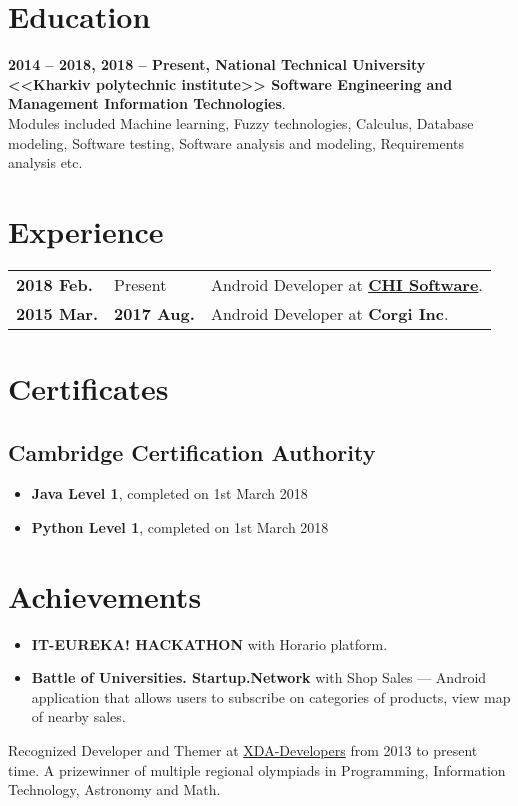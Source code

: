 \documentclass[a4paper]{article}
\begin{document}
	\section*{Education}
	\textbf{2014 -- 2018, 2018 -- Present, National Technical University <<Kharkiv polytechnic institute>> Software Engineering and Management Information Technologies}. \\
	Modules included Machine learning, Fuzzy technologies, Calculus, Database modeling, Software testing, Software analysis and modeling, Requirements analysis etc.

	\section*{Experience}
	\begin{tabular}{@{}l@{\enspace--\enspace}ll}
		\textbf{2018 Feb.} & Present & Android Developer at \href{https://chisw.com}{\textbf{CHI Software}}. \\
		\textbf{2015 Mar.} & \textbf{2017 Aug.} & Android Developer at \textbf{Corgi Inc}. \\
	\end{tabular}
	
	\section*{Certificates}
	\subsection*{Cambridge Certification Authority}
	\begin{itemize}
		\item \textbf{Java Level 1}, completed on 1st March 2018
		\item \textbf{Python Level 1}, completed on 1st March 2018
	\end{itemize}

	\section*{Achievements}
	\begin{itemize}
		\item \textbf{IT-EUREKA! HACKATHON} with Horario platform.
		\item \textbf{Battle of Universities. Startup.Network} with Shop Sales --- Android application that allows users to subscribe on categories of products, view map of nearby sales.
	\end{itemize}
	Recognized Developer and Themer at \href{https://forum.xda-developers.com/member.php?u=3685328}{XDA-Developers} from 2013 to present time.
	A prizewinner of multiple regional olympiads in Programming, Information Technology, Astronomy and Math.
\end{document}
